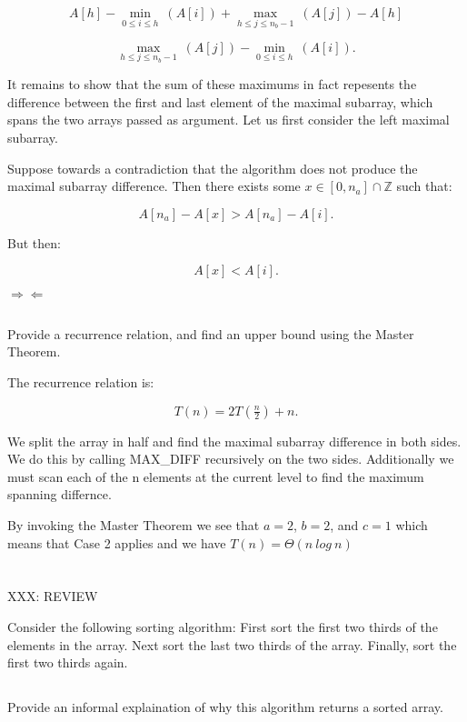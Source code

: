 \documentclass{amsart}
\theoremstyle{definition}
\theoremstyle{remark}
\numberwithin{equation}{section}
\newcommand{\ZZ}{\mathbb Z}
\begin{document}
$$ A[h] - \min_{0 \leq i \leq h}\ ( A[i] ) + \max_{h \leq j \leq n_b -1}\ ( A[j] ) - A[h] $$

$$ \max_{h \leq j \leq n_b -1}\ ( A[j] ) - \min_{0 \leq i \leq h}\ ( A[i] ). $$

\proof 

It remains to show that the sum of these maximums in fact repesents the
difference between the first and last element of the maximal subarray,
which spans the two arrays passed as argument. Let us first consider the
left maximal subarray.

Suppose towards a contradiction that the algorithm does not produce the
maximal subarray difference. Then there exists some $x \in [0,n_a] \cap
\ZZ$ such that:

$$ A[n_a] - A[x] > A[n_a] - A[i]. $$

But then:

$$ A[x] < A[i]. $$

$\Rightarrow\Leftarrow$

\subsection{} Provide a recurrence relation, and find an upper bound
using the Master Theorem.

The recurrence relation is:

$$ T( n ) = 2T(\tfrac{n}{2}) + n. $$

We split the array in half and find the maximal subarray
difference in both sides. We do this by calling MAX\_DIFF recursively on
the two sides. Additionally we must scan each of the n elements at the current
level to find the maximum spanning differnce.

By invoking the Master Theorem we see that $a=2$, $b=2$, and $c=1$ which
means that Case 2 applies and we have $T( n ) = \Theta( n\ log\ n )$


\section{} 
XXX: REVIEW

Consider the following sorting algorithm: First sort the
first two thirds of the elements in the array. Next sort the last two
thirds of the array. Finally, sort the first two thirds again.

\subsection{} Provide an informal explaination of why this algorithm
returns a sorted array. \\
\end{document}
